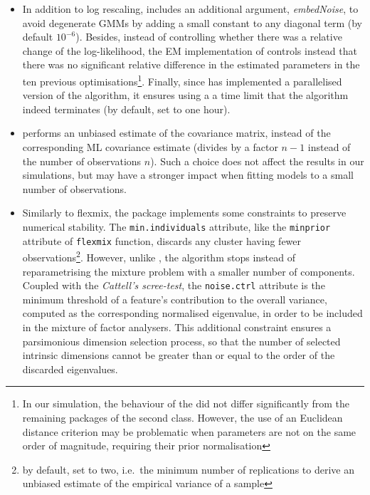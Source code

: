 \begin{itemize}
\item
  In addition to log rescaling,  includes an additional argument, \emph{embedNoise}, to avoid degenerate GMMs by adding a small constant to any diagonal term (by default \(10^{-6}\)). Besides, instead of controlling whether there was a relative change of the log-likelihood, the EM implementation of  controls instead that there was no significant relative difference in the estimated parameters in the ten previous optimisations\footnote{In our simulation, the behaviour of the  did not differ significantly from the remaining packages of the second class. However, the use of an Euclidean distance criterion may be problematic when parameters are not on the same order of magnitude, requiring their prior normalisation}. Finally, since  has implemented a parallelised version of the algorithm, it ensures using a a time limit that the algorithm indeed terminates (by default, set to one hour).
\item
   performs an unbiased estimate of the covariance matrix, instead of the corresponding ML covariance estimate (divides by a factor \(n-1\) instead of the number of observations \(n\)). Such a choice does not affect the results in our simulations, but may have a stronger impact when fitting models to a small number of observations.
\end{itemize}

\color{blue}

\begin{itemize}
\tightlist
\item
  Similarly to flexmix, the  package implements some constraints to preserve numerical stability. The \texttt{min.individuals} attribute, like the \texttt{minprior} attribute of \texttt{flexmix} function, discards any cluster having fewer observations\footnote{by default, set to two, i.e.~the minimum number of replications to derive an unbiased estimate of the empirical variance of a sample}. However, unlike , the algorithm stops instead of reparametrising the mixture problem with a smaller number of components. Coupled with the \emph{Cattell's scree-test}, the \texttt{noise.ctrl} attribute is the minimum threshold of a feature's contribution to the overall variance, computed as the corresponding normalised eigenvalue, in order to be included in the mixture of factor analysers. This additional constraint ensures a parsimonious dimension selection process, so that the number of selected intrinsic dimensions cannot be greater than or equal to the order of the discarded eigenvalues.
  \color{black}
\end{itemize}

